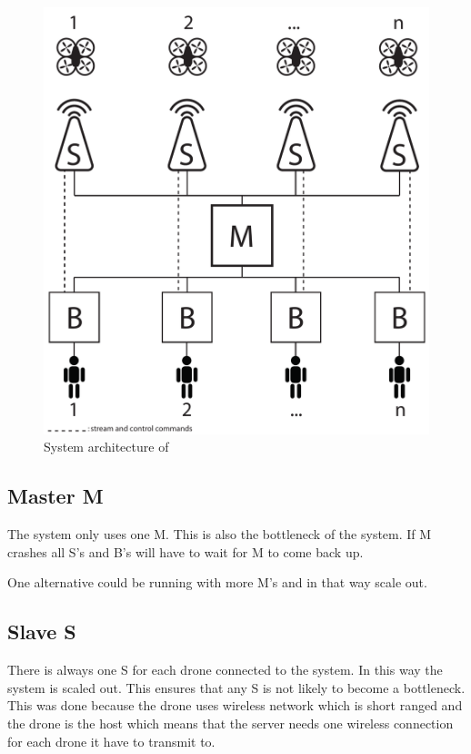 \begin{figure}[htb]
    \centering 
    \includegraphics[width=\textwidth]{gfx/system_architecture.pdf}
    \caption{System architecture of \projectname{}}
    \label{fig:system_architecture}
\end{figure}

\subsection{Master M}

The system only uses one M. This is also the bottleneck of the system. If M crashes all S's and B's will have to wait for M to come back up.

One alternative could be running with more M's and in that way scale out.

\subsection{Slave S}

There is always one S for each drone connected to the system. In this way the system is scaled out. This ensures that any S is not likely to become a bottleneck.
This was done because the drone uses wireless network which is short ranged and the drone is the host which means that the server needs one wireless connection for each drone it have to transmit to.


